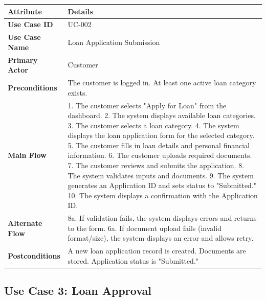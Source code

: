 \documentclass[12pt,a4paper,oneside]{report}
\begin{document}
\begin{table}[htbp]
\centering
\small
\begin{tabularx}{\textwidth}{l l}
\toprule
\textbf{Attribute} & \textbf{Details} \\
\midrule
\textbf{Use Case ID} & UC-002 \\
\textbf{Use Case Name} & Loan Application Submission \\
\textbf{Primary Actor} & Customer \\
\textbf{Preconditions} & The customer is logged in. At least one active loan category exists. \\
\textbf{Main Flow} & 1. The customer selects "Apply for Loan" from the dashboard. 2. The system displays available loan categories. 3. The customer selects a loan category. 4. The system displays the loan application form for the selected category. 5. The customer fills in loan details and personal financial information. 6. The customer uploads required documents. 7. The customer reviews and submits the application. 8. The system validates inputs and documents. 9. The system generates an Application ID and sets status to "Submitted." 10. The system displays a confirmation with the Application ID. \\
\textbf{Alternate Flow} & 8a. If validation fails, the system displays errors and returns to the form. 6a. If document upload fails (invalid format/size), the system displays an error and allows retry. \\
\textbf{Postconditions} & A new loan application record is created. Documents are stored. Application status is "Submitted." \\
\bottomrule
\end{tabularx}
\end{table}

\subsection{Use Case 3: Loan Approval}
\end{document}
